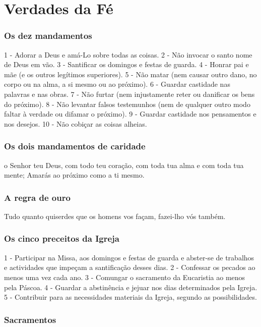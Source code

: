 \section{Verdades da Fé}

\subsubsection{Os dez mandamentos}

1 - Adorar a Deus e amá-Lo sobre todas as coisas.
2 - Não invocar o santo nome de Deus em vão.
3 - Santificar os domingos e festas de guarda.
4 - Honrar pai e mãe (e os outros legítimos superiores).
5 - Não matar (nem causar outro dano, no corpo ou na alma, a si mesmo ou ao próximo).
6 - Guardar castidade nas palavras e nas obras.
7 - Não furtar (nem injustamente reter ou danificar os bens do próximo).
8 - Não levantar falsos testemunhos (nem de qualquer outro modo faltar à verdade ou difamar o próximo).
9 - Guardar castidade nos pensamentos e nos desejos.
10 - Não cobiçar as coisas alheias.

\subsubsection{Os dois mandamentos de caridade}

 o Senhor teu Deus, com todo teu coração, com toda tua alma e com toda tua mente; Amarás ao próximo como a ti mesmo.

\subsubsection{A regra de ouro}

Tudo quanto quiserdes que os homens vos façam, fazei-lho vós também.

\subsubsection{Os cinco preceitos da Igreja}

1 - Participar na Missa, aos domingos e festas de guarda e abster-se de trabalhos e actividades que impeçam a santificação desses dias.
2 - Confessar os pecados ao menos uma vez cada ano.
3 - Comungar o sacramento da Eucaristia ao menos pela Páscoa.
4 - Guardar a abstinência e jejuar nos dias determinados pela Igreja.
5 - Contribuir para as necessidades materiais da Igreja, segundo as possibilidades.

\subsubsection{Sacramentos}

